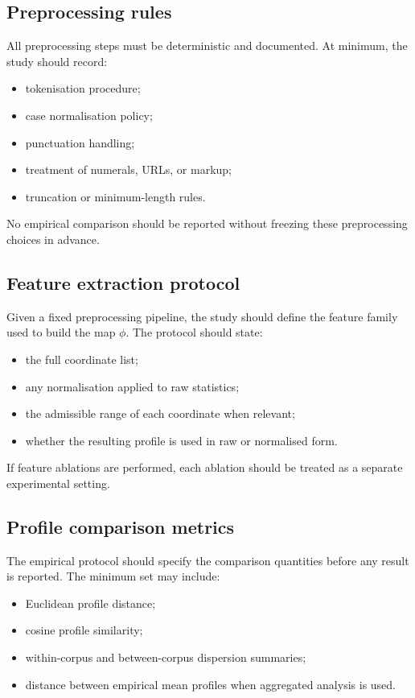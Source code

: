 \documentclass[11pt]{article}
\begin{document}
\subsection{Preprocessing rules}

All preprocessing steps must be deterministic and documented. At minimum, the study should record:
\begin{itemize}
    \item tokenisation procedure;
    \item case normalisation policy;
    \item punctuation handling;
    \item treatment of numerals, URLs, or markup;
    \item truncation or minimum-length rules.
\end{itemize}

No empirical comparison should be reported without freezing these preprocessing choices in advance.

\subsection{Feature extraction protocol}

Given a fixed preprocessing pipeline, the study should define the feature family used to build the map $\phi$. The protocol should state:
\begin{itemize}
    \item the full coordinate list;
    \item any normalisation applied to raw statistics;
    \item the admissible range of each coordinate when relevant;
    \item whether the resulting profile is used in raw or normalised form.
\end{itemize}

If feature ablations are performed, each ablation should be treated as a separate experimental setting.

\subsection{Profile comparison metrics}

The empirical protocol should specify the comparison quantities before any result is reported. The minimum set may include:
\begin{itemize}
    \item Euclidean profile distance;
    \item cosine profile similarity;
    \item within-corpus and between-corpus dispersion summaries;
    \item distance between empirical mean profiles when aggregated analysis is used.
\end{itemize}
\end{document}
